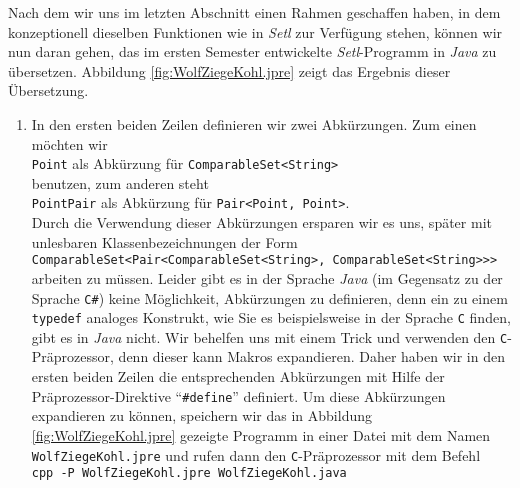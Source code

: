 \noindent
Nach dem wir uns im letzten Abschnitt einen Rahmen geschaffen haben, in dem konzeptionell
dieselben Funktionen wie in \textsl{Setl} zur Verf\"ugung stehen, k\"onnen wir nun daran
gehen, das im ersten Semester entwickelte \textsl{Setl}-Programm in \textsl{Java} zu \"ubersetzen.
Abbildung \ref{fig:WolfZiegeKohl.jpre} zeigt das Ergebnis dieser Übersetzung.
\begin{enumerate}
\item In den ersten beiden Zeilen definieren wir zwei Abk\"urzungen.  Zum einen m\"ochten wir
      \\[0.2cm]
      \hspace*{1.3cm}
      \texttt{Point} \quad als Abk\"urzung f\"ur \quad \texttt{ComparableSet<String>}
      \\[0.2cm]
      benutzen, zum anderen steht
      \\[0.2cm]
      \hspace*{1.3cm}
      \texttt{PointPair} \quad als Abk\"urzung f\"ur \quad \texttt{Pair<Point, Point>}.
      \\[0.2cm]
      Durch die Verwendung dieser Abk\"urzungen ersparen wir es uns, sp\"ater mit
      unlesbaren Klassenbezeichnungen der Form
      \\[0.2cm]
      \hspace*{1.3cm}
      \texttt{ComparableSet<Pair<ComparableSet<String>, ComparableSet<String>>>}
      \\[0.2cm]
      arbeiten zu m\"ussen.  Leider gibt es in der Sprache \textsl{Java} (im Gegensatz zu der
      Sprache \texttt{C\#}) keine
      M\"oglichkeit, Abk\"urzungen zu definieren, denn ein zu einem \texttt{typedef} analoges
      Konstrukt, wie Sie es beispielsweise in der Sprache \texttt{C} finden,
      gibt es in \textsl{Java} nicht.  Wir behelfen uns mit einem Trick und verwenden den
      \texttt{C}-Pr\"aprozessor, denn dieser kann Makros expandieren.  Daher haben wir in
      den ersten beiden Zeilen die entsprechenden Abk\"urzungen mit Hilfe der
      Pr\"aprozessor-Direktive ``\texttt{\#define}'' definiert.
      Um diese Abk\"urzungen expandieren zu k\"onnen, speichern wir das in Abbildung
      \ref{fig:WolfZiegeKohl.jpre} gezeigte Programm in einer Datei mit dem Namen
      \texttt{WolfZiegeKohl.jpre} und rufen dann den \texttt{C}-Pr\"aprozessor mit dem Befehl
      \\[0.2cm]
      \hspace*{1.3cm}
      \texttt{cpp -P WolfZiegeKohl.jpre WolfZiegeKohl.java}
      \\[0.2cm]

\end{enumerate}

